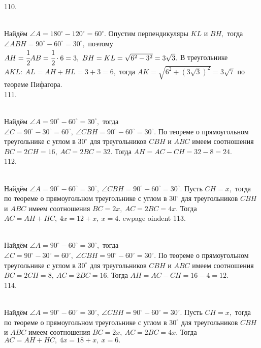 110. \begin{figure}[ht!]
\end{figure}\\
Найдём $\angle A=180^\circ-120^\circ=60^\circ.$ Опустим перпендикуляры $KL$ и $BH,$ тогда $\angle ABH=90^\circ-60^\circ=30^\circ,$ поэтому $AH=\cfrac{1}{2}AB=\cfrac{1}{2}\cdot6=3,\ BH=KL=\sqrt{6^2-3^2}=3\sqrt{3}.$ В треугольнике $AKL:\ AL=AH+HL=3+3=6,$ тогда $AK=\sqrt{6^2+(3\sqrt{3})^2}=3\sqrt{7}$ по теореме Пифагора.\\
111. \begin{figure}[ht!]
\end{figure}\\
Найдём $\angle A=90^\circ-60^\circ=30^\circ,$ тогда $\angle C=90^\circ-30^\circ=60^\circ,\ \angle CBH=90^\circ-60^\circ=30^\circ.$ По теореме о прямоугольном треугольнике с углом в $30^\circ$ для треугольников $CBH$ и $ABC$ имеем соотношения $BC=2CH=16,\ AC=2BC=32.$ Тогда $AH=AC-CH=32-8=24.$\\
112. \begin{figure}[ht!]
\end{figure}\\
Найдём $\angle A=90^\circ-60^\circ=30^\circ,\ \angle CBH=90^\circ-60^\circ=30^\circ.$ Пусть $CH=x,$ тогда по теореме о прямоугольном треугольнике с углом в $30^\circ$ для треугольников $CBH$ и $ABC$ имеем соотношения $BC=2x,\ AC=2BC=4x.$ Тогда $AC=AH+HC,\ 4x=12+x,\ x=4.$
ewpage
oindent
113. \begin{figure}[ht!]
\end{figure}\\
Найдём $\angle A=90^\circ-60^\circ=30^\circ,$ тогда $\angle C=90^\circ-30^\circ=60^\circ,\ \angle CBH=90^\circ-60^\circ=30^\circ.$ По теореме о прямоугольном треугольнике с углом в $30^\circ$ для треугольников $CBH$ и $ABC$ имеем соотношения $BC=2CH=8,\ AC=2BC=16.$ Тогда $AH=AC-CH=16-4=12.$\\
114. \begin{figure}[ht!]
\end{figure}\\
Найдём $\angle A=90^\circ-60^\circ=30^\circ,\ \angle CBH=90^\circ-60^\circ=30^\circ.$ Пусть $CH=x,$ тогда по теореме о прямоугольном треугольнике с углом в $30^\circ$ для треугольников $CBH$ и $ABC$ имеем соотношения $BC=2x,\ AC=2BC=4x.$ Тогда $AC=AH+HC,\ 4x=18+x,\ x=6.$\\
